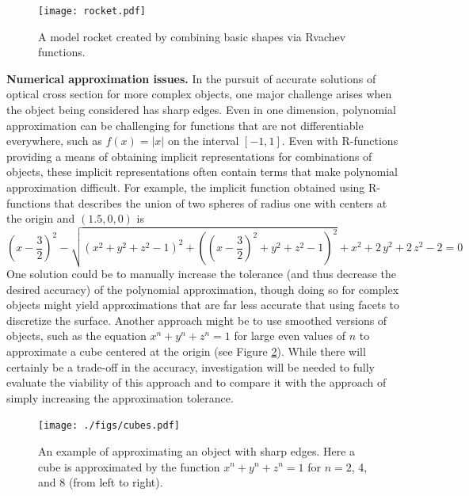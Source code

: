 \documentclass[11pt]{amsart}
\theoremstyle{definition}
\begin{document}
\begin{figure} 
\centerline{\texttt{[image: rocket.pdf]}} 
\caption{A model rocket created by combining basic shapes via Rvachev
functions.}
\label{fig:rocket} 
\end{figure} 

\textbf{Numerical approximation issues.}
In the pursuit of accurate solutions of optical cross section for more complex
objects, one major challenge arises when the object being considered has sharp
edges. Even in one dimension, polynomial approximation can be challenging for
functions that are not differentiable everywhere, such as $f(x) = |x|$ on the
interval $[-1,1]$. Even with R-functions providing a means of obtaining
implicit representations for combinations of objects, these implicit
representations often contain terms that make polynomial approximation
difficult. For example, the implicit function obtained using R-functions that
describes the union of two spheres of radius one with centers at the origin and
$(1.5,0,0)$ is
\[{\left(x-\frac{3}{2}\right)}^2-\sqrt{{\left(x^2+y^2+z^2-1\right)}^2+{\left({\left(x-\frac{3}{2}\right)}^2+y^2+z^2-1\right)}^2}+x^2+2\,y^2+2\,z^2-2 = 0
\]
One solution could be to manually increase the tolerance (and thus decrease the
desired accuracy) of the polynomial approximation, though doing so for complex
objects might yield approximations that are far less accurate that using facets
to discretize the surface. Another approach might be to use smoothed versions
of objects, such as the equation $x^n + y^n + z^n = 1$ for large even values of
$n$ to approximate a cube centered at the origin (see Figure \ref{cubes}).
While there will certainly be a trade-off in the accuracy, investigation will
be needed to fully evaluate the viability of this approach and to compare it
with the approach of simply increasing the approximation tolerance.

\begin{figure}[H]
\texttt{[image: ./figs/cubes.pdf]}
\caption{An example of approximating an object with sharp edges. Here a cube is approximated by the function $x^n + y^n + z^n = 1$ for $n = 2$, 4, and 8 (from left to right).}
\label{cubes}
\end{figure}
\end{document}
